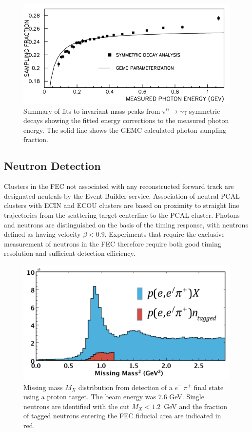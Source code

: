 \begin{figure}[h]
\centering
\includegraphics[width=1.0\columnwidth,keepaspectratio]{img/fx-study-summary-2.png}
\caption[]{Summary of fits to invariant mass peaks from $\pi^0 \rightarrow \gamma \gamma$ symmetric decays showing the fitted energy corrections to the measured photon energy.  The solid line shows the GEMC calculated photon sampling fraction.}
\label{fig:fx-study-summary-2}
\end{figure}

\subsection{Neutron Detection}
Clusters in the FEC not associated with any reconstructed forward track are designated neutrals by the Event Builder service.  Association of neutral PCAL clusters with ECIN and ECOU clusters are based on proximity to straight line trajectories from the scattering target centerline to the PCAL cluster.  Photons and neutrons are distinguished on the basis of the timing response, with neutrons defined as having velocity $\beta < 0.9$.  Experiments that require the exclusive measurement of neutrons in the FEC therefore require both good timing resolution and sufficient detection efficiency. 

\begin{figure}[h]
\centering
\includegraphics[width=1.0\columnwidth,keepaspectratio]{img/S10_4_0.png}
\caption[]{Missing mass $M_X$ distribution from detection of a $e^-~\pi^+$ final state using a proton target.  The beam energy was 7.6 GeV.  Single neutrons are identified with the cut $M_X < 1.2$~GeV and the fraction of tagged neutrons entering the FEC fiducial area are indicated in red. }
\label{fig:S10_4_0}
\end{figure}

